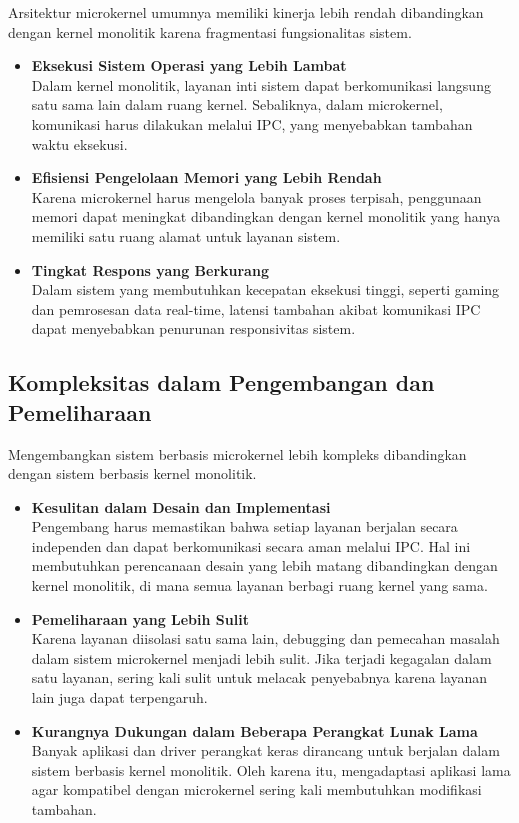 Arsitektur microkernel umumnya memiliki kinerja lebih rendah dibandingkan dengan kernel monolitik karena fragmentasi fungsionalitas sistem.

\begin{itemize}
	\item \textbf{Eksekusi Sistem Operasi yang Lebih Lambat} \\
	Dalam kernel monolitik, layanan inti sistem dapat berkomunikasi langsung satu sama lain dalam ruang kernel. Sebaliknya, dalam microkernel, komunikasi harus dilakukan melalui IPC, yang menyebabkan tambahan waktu eksekusi.
	
	\item \textbf{Efisiensi Pengelolaan Memori yang Lebih Rendah} \\
	Karena microkernel harus mengelola banyak proses terpisah, penggunaan memori dapat meningkat dibandingkan dengan kernel monolitik yang hanya memiliki satu ruang alamat untuk layanan sistem.
	
	\item \textbf{Tingkat Respons yang Berkurang} \\
	Dalam sistem yang membutuhkan kecepatan eksekusi tinggi, seperti gaming dan pemrosesan data real-time, latensi tambahan akibat komunikasi IPC dapat menyebabkan penurunan responsivitas sistem.
\end{itemize}

\subsection{Kompleksitas dalam Pengembangan dan Pemeliharaan}

Mengembangkan sistem berbasis microkernel lebih kompleks dibandingkan dengan sistem berbasis kernel monolitik.

\begin{itemize}
	\item \textbf{Kesulitan dalam Desain dan Implementasi} \\
	Pengembang harus memastikan bahwa setiap layanan berjalan secara independen dan dapat berkomunikasi secara aman melalui IPC. Hal ini membutuhkan perencanaan desain yang lebih matang dibandingkan dengan kernel monolitik, di mana semua layanan berbagi ruang kernel yang sama.
	
	\item \textbf{Pemeliharaan yang Lebih Sulit} \\
	Karena layanan diisolasi satu sama lain, debugging dan pemecahan masalah dalam sistem microkernel menjadi lebih sulit. Jika terjadi kegagalan dalam satu layanan, sering kali sulit untuk melacak penyebabnya karena layanan lain juga dapat terpengaruh.
	
	\item \textbf{Kurangnya Dukungan dalam Beberapa Perangkat Lunak Lama} \\
	Banyak aplikasi dan driver perangkat keras dirancang untuk berjalan dalam sistem berbasis kernel monolitik. Oleh karena itu, mengadaptasi aplikasi lama agar kompatibel dengan microkernel sering kali membutuhkan modifikasi tambahan.
\end{itemize}

